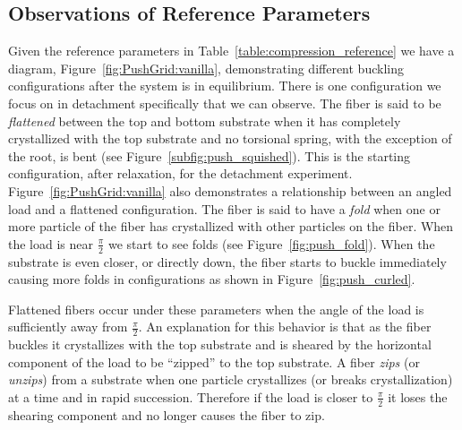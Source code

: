 \subsection{Observations of Reference Parameters}

Given the reference parameters in Table~\ref{table:compression_reference} we have a diagram, Figure~\ref{fig:PushGrid:vanilla}, demonstrating different buckling configurations after the system is in equilibrium. There is one configuration we focus on in detachment specifically that we can observe. The fiber is said to be \textit{flattened} between the top and bottom substrate when it has completely crystallized with the top substrate and no torsional spring, with the exception of the root, is bent (see Figure~\ref{subfig:push_squished}). This is the starting configuration, after relaxation, for the detachment experiment. Figure~\ref{fig:PushGrid:vanilla} also demonstrates a relationship between an angled load and a flattened configuration. The fiber is said to have a \textit{fold} when one or more particle of the fiber has crystallized with other particles on the fiber. When the load is near $\frac{\pi}{2}$ we start to see folds (see Figure~\ref{fig:push_fold}). When the substrate is even closer, or directly down, the fiber starts to buckle immediately causing more folds in configurations as shown in Figure~\ref{fig:push_curled}.

Flattened fibers occur under these parameters when the angle of the load is sufficiently away from $\frac{\pi}{2}$. An explanation for this behavior is that as the fiber buckles it crystallizes with the top substrate and is sheared by the horizontal component of the load to be ``zipped'' to the top substrate. A fiber \textit{zips} (or \textit{unzips}) from a substrate when one particle crystallizes (or breaks crystallization) at a time and in rapid succession. Therefore if the load is closer to $\frac{\pi}{2}$ it loses the shearing component and no longer causes the fiber to zip.

